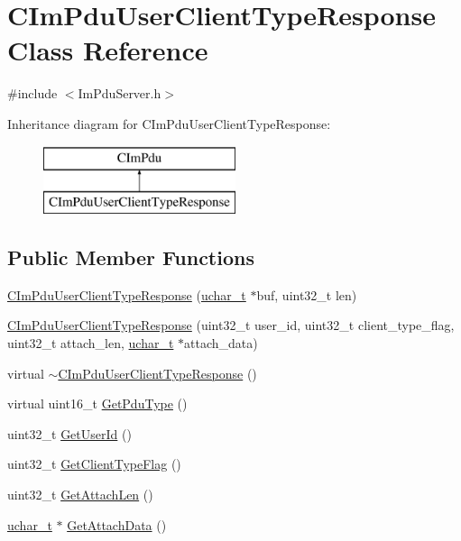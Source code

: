 \hypertarget{class_c_im_pdu_user_client_type_response}{}\section{C\+Im\+Pdu\+User\+Client\+Type\+Response Class Reference}
\label{class_c_im_pdu_user_client_type_response}


{\ttfamily \#include $<$Im\+Pdu\+Server.\+h$>$}

Inheritance diagram for C\+Im\+Pdu\+User\+Client\+Type\+Response\+:\begin{figure}[H]
\begin{center}
\leavevmode
\includegraphics[height=2.000000cm]{class_c_im_pdu_user_client_type_response}
\end{center}
\end{figure}
\subsection*{Public Member Functions}
\begin{DoxyCompactItemize}
\item 
\hyperlink{class_c_im_pdu_user_client_type_response_ad0d611d33bfb2775958ed54459d0f72b}{C\+Im\+Pdu\+User\+Client\+Type\+Response} (\hyperlink{base_2ostype_8h_a124ea0f8f4a23a0a286b5582137f0b8d}{uchar\+\_\+t} $\ast$buf, uint32\+\_\+t len)
\item 
\hyperlink{class_c_im_pdu_user_client_type_response_a953d66cba53505807d49fed4b1e98981}{C\+Im\+Pdu\+User\+Client\+Type\+Response} (uint32\+\_\+t user\+\_\+id, uint32\+\_\+t client\+\_\+type\+\_\+flag, uint32\+\_\+t attach\+\_\+len, \hyperlink{base_2ostype_8h_a124ea0f8f4a23a0a286b5582137f0b8d}{uchar\+\_\+t} $\ast$attach\+\_\+data)
\item 
virtual \hyperlink{class_c_im_pdu_user_client_type_response_a71b674f83565c555dc8cedc3687ed94f}{$\sim$\+C\+Im\+Pdu\+User\+Client\+Type\+Response} ()
\item 
virtual uint16\+\_\+t \hyperlink{class_c_im_pdu_user_client_type_response_acdaf5db2b08b49350ca7d5f4c5f3fe4c}{Get\+Pdu\+Type} ()
\item 
uint32\+\_\+t \hyperlink{class_c_im_pdu_user_client_type_response_a1363729ec20bb55d3bf5b6f2d1c838f1}{Get\+User\+Id} ()
\item 
uint32\+\_\+t \hyperlink{class_c_im_pdu_user_client_type_response_a76dea06ca170e256563a850daf231fb2}{Get\+Client\+Type\+Flag} ()
\item 
uint32\+\_\+t \hyperlink{class_c_im_pdu_user_client_type_response_a595bc631560186fbaf51cbedcbcd8254}{Get\+Attach\+Len} ()
\item 
\hyperlink{base_2ostype_8h_a124ea0f8f4a23a0a286b5582137f0b8d}{uchar\+\_\+t} $\ast$ \hyperlink{class_c_im_pdu_user_client_type_response_a123972451afd86b3c428dfc5b3c511fe}{Get\+Attach\+Data} ()
\end{DoxyCompactItemize}
